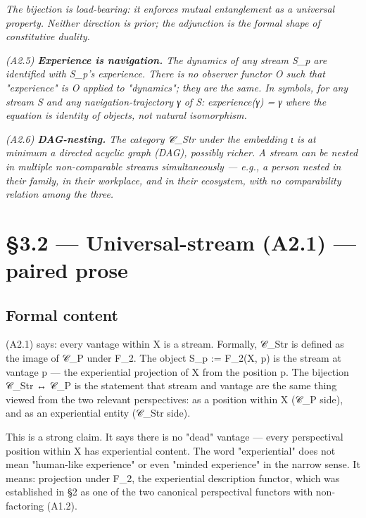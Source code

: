 \documentclass[11pt, openany]{book}
\newcommand{\sectionbreak}{\clearpage}
\begin{document}
\textit{The bijection is load-bearing: it enforces mutual entanglement as a universal property. Neither direction is prior; the adjunction is the formal shape of constitutive duality.}

\textit{(A2.5) \textbf{Experience is navigation.} The dynamics of any stream S\_\allowbreak{}p are identified with S\_\allowbreak{}p's experience. There is no observer functor O such that "experience" is O applied to "dynamics"; they are the same. In symbols, for any stream S and any navigation-trajectory γ of S:}
\textit{experience(γ) = γ}
\textit{where the equation is identity of objects, not natural isomorphism.}

\textit{(A2.6) \textbf{DAG-nesting.} The category 𝒞\_\allowbreak{}Str under the embedding ι is at minimum a directed acyclic graph (DAG), possibly richer. A stream can be nested in multiple non-comparable streams simultaneously --- e.g., a person nested in their family, in their workplace, and in their ecosystem, with no comparability relation among the three.}

\sectionbreak

\section{§3.2 --- Universal-stream (A2.1) --- paired prose}

\subsection{Formal content}

(A2.1) says: every vantage within X is a stream. Formally, 𝒞\_\allowbreak{}Str is defined as the image of 𝒞\_\allowbreak{}P under F\_\allowbreak{}2. The object S\_\allowbreak{}p := F\_\allowbreak{}2(X, p) is the stream at vantage p --- the experiential projection of X from the position p. The bijection 𝒞\_\allowbreak{}Str ↔ 𝒞\_\allowbreak{}P is the statement that stream and vantage are the same thing viewed from the two relevant perspectives: as a position within X (𝒞\_\allowbreak{}P side), and as an experiential entity (𝒞\_\allowbreak{}Str side).

This is a strong claim. It says there is no "dead" vantage --- every perspectival position within X has experiential content. The word "experiential" does not mean "human-like experience" or even "minded experience" in the narrow sense. It means: projection under F\_\allowbreak{}2, the experiential description functor, which was established in §2 as one of the two canonical perspectival functors with non-factoring (A1.2).
\end{document}
